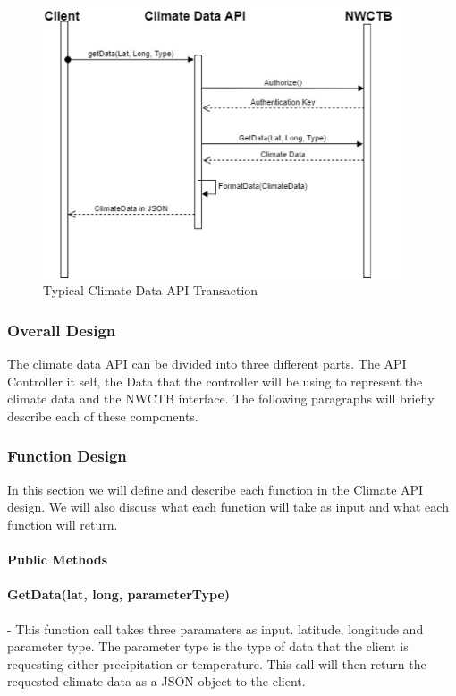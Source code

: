 \documentclass[onecolumn, draftclsnofoot,10pt, compsoc]{article}
\begin{document}
		\begin{figure}[htb]
			\begin{center}
				\includegraphics[width=300pt]{UMLDiagrams/ClimateDataAPITransaction.eps}
			\end{center}
			\caption{Typical Climate Data API Transaction}
			\label{fig:CDAPITrans}
		\end{figure}



			\subsubsection{Overall Design}
				The climate data API can be divided into three different parts. The API Controller it self, the Data that the controller will be using to represent the climate data and the NWCTB interface. The following paragraphs will briefly describe each of these components.
			\subsubsection{Function Design}
			In this section we will define and describe each function in the Climate API design. We will also discuss what each function will take as input and what each function will return.
					\paragraph{\textbf{Public Methods}}


					\paragraph{GetData(lat, long, parameterType)} - This function call takes three paramaters as input. latitude, longitude and parameter type. The parameter type is the type of data that the client is requesting either precipitation or temperature. This call will then return the requested climate data as a JSON object to the client.\\
\end{document}
